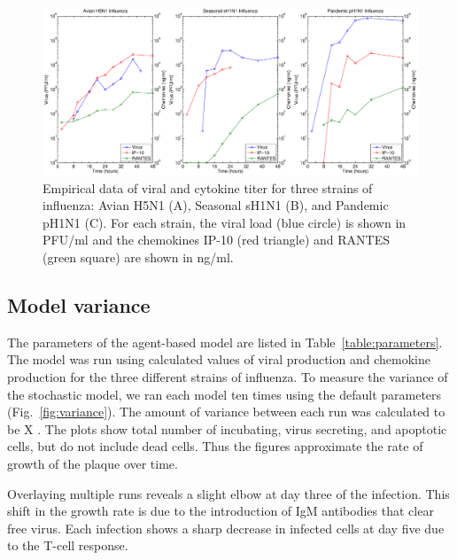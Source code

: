 \documentclass[10pt]{article}
\begin{document}
\begin{figure}[ht!]
\begin{center}
 \includegraphics[width=.9\textwidth]{data}
 \end{center}
\caption{Empirical data of viral and cytokine titer for three strains of influenza: Avian H5N1 (A), Seasonal sH1N1 (B), and Pandemic pH1N1 (C).  For each strain, the viral load (blue circle) is shown in PFU/ml and the chemokines IP-10 (red triangle) and RANTES (green square) are shown in ng/ml.} 
 \label{fig:data}
\end{figure}

\subsection*{Model variance}

The parameters of the agent-based model are listed in Table~\ref{table:parameters}.  The model was run using calculated values of viral production and chemokine production for the three different strains of influenza.  To measure the variance of the stochastic model, we ran each model ten times using the default parameters (Fig.~\ref{fig:variance}).  The amount of variance between each run was calculated to be X .  The plots show total number of incubating, virus secreting, and apoptotic cells, but do not include dead cells.  Thus the figures approximate the rate of growth of the plaque over time.

Overlaying multiple runs reveals a slight elbow at day three of the infection.  This shift in the growth rate is due to the introduction of IgM antibodies that clear free virus.  Each infection shows a sharp decrease in infected cells at day five due to the T-cell response. 
\end{document}
